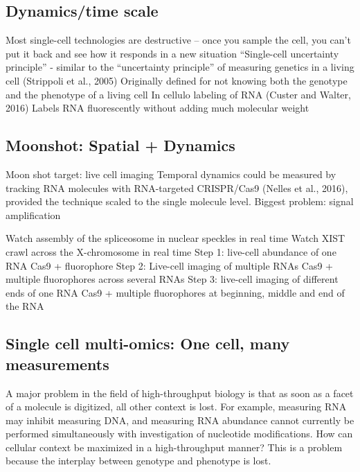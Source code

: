 \subsection{Dynamics/time scale}

Most single-cell technologies are destructive -- once you sample the cell, you can’t put it back and see how it responds in a new situation
“Single-cell uncertainty principle” - similar to the “uncertainty principle” of measuring genetics in a living cell (Strippoli et al., 2005)
Originally defined for not knowing both the genotype and the phenotype of a living cell
In cellulo labeling of RNA (Custer and Walter, 2016)
Labels RNA fluorescently without adding much molecular weight


\subsection{Moonshot: Spatial + Dynamics}

Moon shot target: live cell imaging
Temporal dynamics could be measured by tracking RNA molecules with RNA-targeted CRISPR/Cas9 (Nelles et al., 2016), provided the technique scaled to the single molecule level.
Biggest problem: signal amplification

Watch assembly of the spliceosome in nuclear speckles in real time
Watch XIST crawl across the X-chromosome in real time
Step 1: live-cell abundance of one RNA
Cas9 + fluorophore
Step 2: Live-cell imaging of multiple RNAs
Cas9 + multiple fluorophores across several RNAs
Step 3: live-cell imaging of different ends of one RNA
Cas9 + multiple fluorophores at beginning, middle and end of the RNA



\subsection{Single cell multi-omics: One cell, many measurements}

A major problem in the field of high-throughput biology is that as soon as a facet of a molecule is digitized, all other context is lost. For example, measuring RNA may inhibit measuring DNA, and measuring RNA abundance cannot currently be performed simultaneously with investigation of nucleotide modifications. How can cellular context be maximized in a high-throughput manner?
This is a problem because the interplay between genotype and phenotype is lost.

